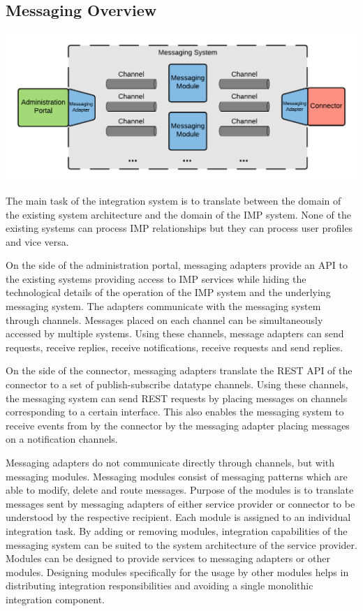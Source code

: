 \subsection{Messaging Overview}

\begin{center}
    \includegraphics[scale=0.6]{Diagrams/Integration Architecture 1/Technological Integration/3. Messaging Integration.pdf}
\end{center}

The main task of the integration system is to translate between the domain of the existing system architecture and the domain of the IMP system. None of the existing systems can process IMP relationships but they can process user profiles and vice versa. 

On the side of the administration portal, messaging adapters provide an API to the existing systems providing access to IMP services while hiding the technological details of the operation of the IMP system and the underlying messaging system. The adapters communicate with the messaging system through channels. Messages placed on each channel can be simultaneously accessed by multiple systems. Using these channels, message adapters can send requests, receive replies, receive notifications, receive requests and send replies. 

On the side of the connector, messaging adapters translate the REST API of the connector to a set of publish-subscribe datatype channels. Using these channels, the messaging system can send REST requests by placing messages on channels corresponding to a certain interface. This also enables the messaging system to receive events from by the connector by the messaging adapter placing messages on a notification channels.

Messaging adapters do not communicate directly through channels, but with messaging modules. Messaging modules consist of messaging patterns which are able to modify, delete and route messages. Purpose of the modules is to translate messages sent by messaging adapters of either service provider or connector to be understood by the respective recipient. Each module is assigned to an individual integration task. By adding or removing modules, integration capabilities of the messaging system can be suited to the system architecture of the service provider. Modules can be designed to provide services to messaging adapters or other modules. Designing modules specifically for the usage by other modules helps in distributing integration responsibilities and avoiding a single monolithic integration component.

